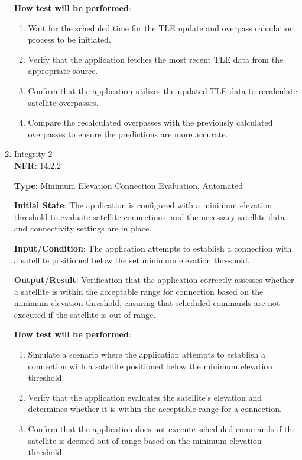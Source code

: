 \documentclass[12pt, titlepage]{article}
\begin{document}
\begin{enumerate}
\textbf{How test will be performed}: 
\begin{enumerate}
    \item Wait for the scheduled time for the TLE update and overpass calculation process to be initiated.

    \item Verify that the application fetches the most recent TLE data from the appropriate source.
    \item Confirm that the application utilizes the updated TLE data to recalculate satellite overpasses.

    \item Compare the recalculated overpasses with the previously calculated overpasses to ensure the predictions are more accurate.

\end{enumerate}

\item {Integrity-2\\}
\textbf{NFR}: 14.2.2

\textbf{Type}: Minimum Elevation Connection Evaluation, Automated


\textbf{Initial State}: The application is configured with a minimum elevation threshold to evaluate satellite connections, and the necessary satellite data and connectivity settings are in place.



\textbf{Input/Condition}: The application attempts to establish a connection with a satellite positioned below the set minimum elevation threshold.



\textbf{Output/Result}: Verification that the application correctly assesses whether a satellite is within the acceptable range for connection based on the minimum elevation threshold, ensuring that scheduled commands are not executed if the satellite is out of range.

\textbf{How test will be performed}: 
\begin{enumerate}
    \item Simulate a scenario where the application attempts to establish a connection with a satellite positioned below the minimum elevation threshold.

    \item Verify that the application evaluates the satellite's elevation and determines whether it is within the acceptable range for a connection.

    \item Confirm that the application does not execute scheduled commands if the satellite is deemed out of range based on the minimum elevation threshold.
\end{enumerate}


\end{enumerate}
\end{document}
